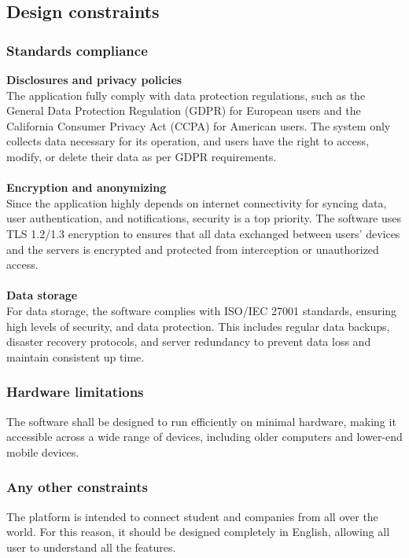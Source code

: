 \documentclass[11pt,twoside]{article}
\begin{document}
	\subsection{Design constraints}	
		\subsubsection{Standards compliance}
\textbf{Disclosures and privacy policies} \\
The application fully comply with data protection regulations, such as the General Data Protection Regulation (GDPR) for European users and the California Consumer Privacy Act (CCPA) for American users. The system only collects data necessary for its operation, and users have the right to access, modify, or delete their data as per GDPR requirements.\\
\\
\textbf{Encryption and anonymizing} \\
Since the application highly depends on internet connectivity for syncing data, user authentication, and notifications, security is a top priority. The software uses TLS 1.2/1.3 encryption to ensures that all data exchanged between users’ devices and the servers is encrypted and protected from interception or unauthorized access.\\
\\
\textbf{Data storage} \\
For data storage, the software complies with ISO/IEC 27001 standards, ensuring high levels of security, and data protection. This includes regular data backups, disaster recovery protocols, and server redundancy to prevent data loss and maintain consistent up time.
		
		\subsubsection{Hardware limitations}

The software shall be designed to run efficiently on minimal hardware, making it accessible across a wide range of devices, including older computers and lower-end mobile devices.
		
		\subsubsection{Any other constraints}
		
The platform is intended to connect student and companies from all over the world. For this reason, it should be designed completely in English, allowing all user to understand all the features.
		
\end{document}
